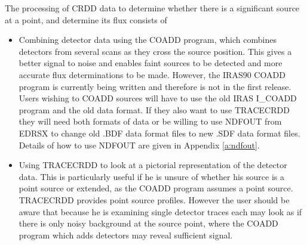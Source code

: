 The processing of CRDD data to determine whether there is a significant source
at a point, and determine its flux consists of
\begin{itemize}
\item Combining detector data using the COADD program, which combines detectors
from several scans as they cross the source position. This gives a better
signal to noise and enables faint sources to be detected and more accurate flux
determinations to be made.
However, the IRAS90 COADD program is currently being written and therefore is
not in the first release. Users wishing to COADD sources will have to use the
old IRAS I\_COADD program and the old data format. If they also want to use
TRACECRDD they will need both formats of data or be willing to use NDFOUT from
EDRSX to change old .BDF data format files to new .SDF data format files.
Details of how to use NDFOUT are given in Appendix \ref{a:ndfout}.
\item Using TRACECRDD to look at a pictorial representation of the detector
data. This is particularly useful if he is unsure of whether his source is a
point source or extended, as the COADD program assumes a point source.
TRACECRDD provides point source profiles. 
However the user should be aware that because he is examining single detector
traces each may look as if there is only noisy background at the source point,
where the COADD program which adds detectors may reveal sufficient signal.
\end{itemize}

